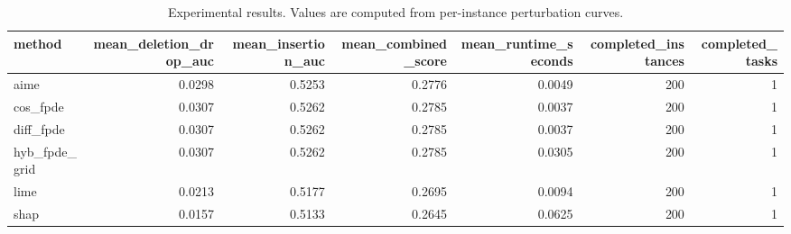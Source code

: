 \begin{table}[t]
\caption{Experimental results. Values are computed from per-instance perturbation curves.}
\label{tab:main_results_computed}
\centering
\begin{tabular}{lrrrrrr}
\toprule
method & mean\_deletion\_drop\_auc & mean\_insertion\_auc & mean\_combined\_score & mean\_runtime\_seconds & completed\_instances & completed\_tasks \\
\midrule
aime & 0.0298 & 0.5253 & 0.2776 & 0.0049 & 200 & 1 \\
cos\_fpde & 0.0307 & 0.5262 & 0.2785 & 0.0037 & 200 & 1 \\
diff\_fpde & 0.0307 & 0.5262 & 0.2785 & 0.0037 & 200 & 1 \\
hyb\_fpde\_grid & 0.0307 & 0.5262 & 0.2785 & 0.0305 & 200 & 1 \\
lime & 0.0213 & 0.5177 & 0.2695 & 0.0094 & 200 & 1 \\
shap & 0.0157 & 0.5133 & 0.2645 & 0.0625 & 200 & 1 \\
\bottomrule
\end{tabular}

\end{table}
